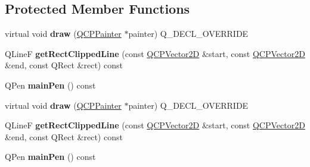 \subsection*{Protected Member Functions}
\begin{DoxyCompactItemize}
\item 
virtual void {\bfseries draw} (\hyperlink{class_q_c_p_painter}{Q\+C\+P\+Painter} $\ast$painter) Q\+\_\+\+D\+E\+C\+L\+\_\+\+O\+V\+E\+R\+R\+I\+DE\hypertarget{class_q_c_p_item_line_ae184140b61b2ef5b8edde76304447200}{}\label{class_q_c_p_item_line_ae184140b61b2ef5b8edde76304447200}

\item 
Q\+LineF {\bfseries get\+Rect\+Clipped\+Line} (const \hyperlink{class_q_c_p_vector2_d}{Q\+C\+P\+Vector2D} \&start, const \hyperlink{class_q_c_p_vector2_d}{Q\+C\+P\+Vector2D} \&end, const Q\+Rect \&rect) const \hypertarget{class_q_c_p_item_line_ad8ea8403df3e11d0beddc44e1227e655}{}\label{class_q_c_p_item_line_ad8ea8403df3e11d0beddc44e1227e655}

\item 
Q\+Pen {\bfseries main\+Pen} () const \hypertarget{class_q_c_p_item_line_a7b5bc4ebacb55774b87c91b308ca7912}{}\label{class_q_c_p_item_line_a7b5bc4ebacb55774b87c91b308ca7912}

\item 
virtual void {\bfseries draw} (\hyperlink{class_q_c_p_painter}{Q\+C\+P\+Painter} $\ast$painter) Q\+\_\+\+D\+E\+C\+L\+\_\+\+O\+V\+E\+R\+R\+I\+DE\hypertarget{class_q_c_p_item_line_a3aaf4e599727f71e6b96b4b36f82c939}{}\label{class_q_c_p_item_line_a3aaf4e599727f71e6b96b4b36f82c939}

\item 
Q\+LineF {\bfseries get\+Rect\+Clipped\+Line} (const \hyperlink{class_q_c_p_vector2_d}{Q\+C\+P\+Vector2D} \&start, const \hyperlink{class_q_c_p_vector2_d}{Q\+C\+P\+Vector2D} \&end, const Q\+Rect \&rect) const \hypertarget{class_q_c_p_item_line_ad8ea8403df3e11d0beddc44e1227e655}{}\label{class_q_c_p_item_line_ad8ea8403df3e11d0beddc44e1227e655}

\item 
Q\+Pen {\bfseries main\+Pen} () const \hypertarget{class_q_c_p_item_line_a7b5bc4ebacb55774b87c91b308ca7912}{}\label{class_q_c_p_item_line_a7b5bc4ebacb55774b87c91b308ca7912}

\end{DoxyCompactItemize}
